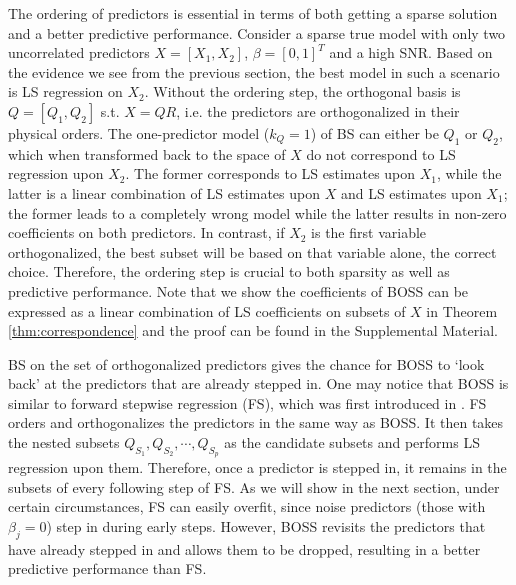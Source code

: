 The ordering of predictors is essential in terms of both getting a sparse solution and a better predictive performance. Consider a sparse true model with only two uncorrelated predictors $X=[X_1,X_2]$, $\beta=[0,1]^T$ and a high SNR. Based on the evidence we see from the previous section, the best model in such a scenario is LS regression on $X_2$. Without the ordering step, the orthogonal basis is $Q=[Q_1,Q_2]$ s.t. $X=QR$, i.e. the predictors are orthogonalized in their physical orders. The one-predictor model ($k_Q=1$) of BS can either be $Q_1$ or $Q_2$, which when transformed back to the space of $X$ do not correspond to LS regression upon $X_2$. The former corresponds to LS estimates upon $X_1$, while the latter is a linear combination of LS estimates upon $X$ and LS estimates upon $X_1$; the former leads to a completely wrong model while the latter results in non-zero coefficients on both predictors. In contrast, if $X_2$ is the first variable orthogonalized, the best subset will be based on that variable alone, the correct choice. Therefore, the ordering step is crucial to both sparsity as well as predictive performance. Note that we show the coefficients of BOSS can be expressed as a linear combination of LS coefficients on subsets of $X$ in Theorem \ref{thm:correspondence} and the proof can be found in the Supplemental Material. 

BS on the set of orthogonalized predictors gives the chance for BOSS to `look back' at the predictors that are already stepped in. One may notice that BOSS is similar to forward stepwise regression (FS), which was first introduced in \citet{efroymson1960multiple}. FS orders and orthogonalizes the predictors in the same way as BOSS. It then takes the nested subsets $Q_{S_1}, Q_{S_2}, \cdots, Q_{S_p}$ as the candidate subsets and performs LS regression upon them. Therefore, once a predictor is stepped in, it remains in the subsets of every following step of FS. As we will show in the next section, under certain circumstances, FS can easily overfit, since noise predictors (those with $\beta_j=0$) step in during early steps. However, BOSS revisits the predictors that have already stepped in and allows them to be dropped, resulting in a better predictive performance than FS.

